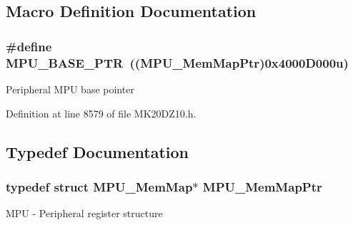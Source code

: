 \subsection{Macro Definition Documentation}
\subsubsection[{\texorpdfstring{M\+P\+U\+\_\+\+B\+A\+S\+E\+\_\+\+P\+TR}{MPU_BASE_PTR}}]{\setlength{\rightskip}{0pt plus 5cm}\#define M\+P\+U\+\_\+\+B\+A\+S\+E\+\_\+\+P\+TR~(({\bf M\+P\+U\+\_\+\+Mem\+Map\+Ptr})0x4000\+D000u)}\hypertarget{group___m_p_u___peripheral_gae2d60f80178d84225d77e5f0214d1f1d}{}\label{group___m_p_u___peripheral_gae2d60f80178d84225d77e5f0214d1f1d}
Peripheral M\+PU base pointer 

Definition at line 8579 of file M\+K20\+D\+Z10.\+h.



\subsection{Typedef Documentation}
\subsubsection[{\texorpdfstring{M\+P\+U\+\_\+\+Mem\+Map\+Ptr}{MPU_MemMapPtr}}]{\setlength{\rightskip}{0pt plus 5cm}typedef struct {\bf M\+P\+U\+\_\+\+Mem\+Map}$\ast$ {\bf M\+P\+U\+\_\+\+Mem\+Map\+Ptr}}\hypertarget{group___m_p_u___peripheral_gac3cd3449552560380e80c90b2207d18b}{}\label{group___m_p_u___peripheral_gac3cd3449552560380e80c90b2207d18b}
M\+PU -\/ Peripheral register structure 